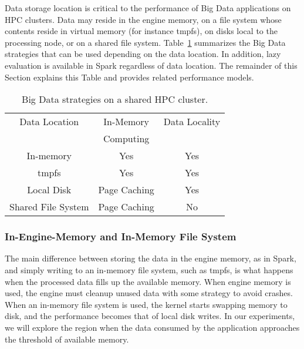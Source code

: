 \documentclass{IEEEtran}
\begin{document}
Data storage location is critical to the performance of Big Data 
applications on HPC clusters.
Data may reside in the engine memory, on 
a file system whose contents reside in virtual memory (for instance 
tmpfs), on disks local to the processing node, or on a shared 
file system. Table~\ref{table:features} summarizes the Big Data 
strategies that can be used depending on the data location. In 
addition, lazy evaluation is available in Spark regardless of data 
location. The remainder of this Section explains this Table and 
provides related performance models.
\begin{table}
\centering
\begin{tabular}{c|cc}
   \rowcolor{headcolor}
    Data Location                 & In-Memory     & Data Locality        \\
    \rowcolor{headcolor}
                                  & Computing     &                     \\
                                  \hline          
In-memory                         & \cellcolor{green!25} Yes           & \cellcolor{green!25}Yes                      \\
tmpfs                             & \cellcolor{green!25} Yes           & \cellcolor{green!25}Yes                  \\
Local Disk                        & \cellcolor{orange!25}Page Caching  & \cellcolor{green!25}Yes                  \\
Shared File System                & \cellcolor{orange!25}Page Caching  & \cellcolor{red!25}No                
\end{tabular}
\caption{Big Data strategies on a shared HPC cluster.}
\label{table:features}
\end{table}

\subsubsection{In-Engine-Memory and In-Memory File System} 

 The main difference between storing the data in the engine memory, as in Spark, 
 and simply writing to an in-memory file system, such as tmpfs, is 
 what happens when the processed data fills up the available 
 memory. When engine memory is used, the engine must cleanup 
 unused data with some strategy to avoid crashes. When an in-memory 
 file system is used, the kernel starts swapping memory to disk, and 
 the performance becomes that of local disk writes. In our experiments, 
 we will explore the region  when the data consumed by the 
 application approaches the threshold of available memory.
\end{document}

